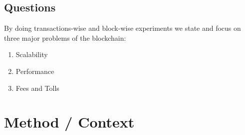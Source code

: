 \documentclass[USenglish]{uit-thesis}
\begin{document}
\subsection{Questions}
\label{sec:questions}
By doing transactions-wise and block-wise experiments
we state and focus on three major problems of the
blockchain:
\begin{enumerate}[noitemsep]
	\item Scalability
	\item Performance
	\item Fees and Tolls
\end{enumerate}





\section{Method / Context}
\label{sec:method}
\end{document}
